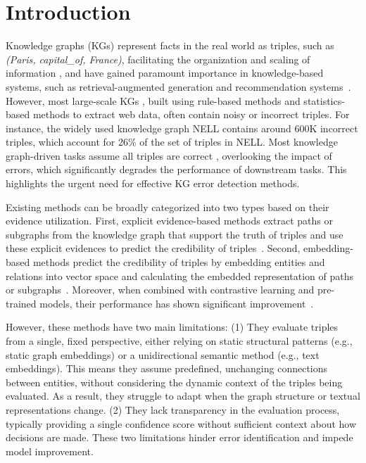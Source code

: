 \section{Introduction}

Knowledge graphs (KGs) \cite{kg} represent facts in the real world as triples, such as \textit{(Paris, capital\_of, France)}, facilitating the organization and scaling of information \cite{kg-info}, and have gained paramount importance in knowledge-based systems, such as retrieval-augmented generation and recommendation systems~\cite{recommend}.
% 
However, most large-scale KGs \cite{kg}, built using rule-based methods and statistics-based methods to extract web data, often contain noisy or incorrect triples. For instance, the widely used knowledge graph NELL \cite{survey} contains around 600K incorrect triples, which account for 26\% of the set of triples in NELL. Most knowledge graph-driven tasks assume all triples are correct \cite{survey}, overlooking the impact of errors, which significantly degrades the performance of downstream tasks. This highlights the urgent need for effective KG error detection methods.

Existing methods can be broadly categorized into two types based on their evidence utilization. First, explicit evidence-based methods extract paths or subgraphs from the knowledge graph that support the truth of triples and use these explicit evidences to predict the credibility of triples~\cite{shi}. Second, embedding-based methods predict the credibility of triples by embedding entities and relations into vector space and calculating the embedded representation of paths or subgraphs~\cite{kgttm,embedding2}. Moreover, when combined with contrastive learning and pre-trained models, their performance has shown significant improvement~\cite{kg-bert,cca,sesicl}.

However, these methods have two main limitations: (1) They evaluate triples from a single, fixed perspective, either relying on static structural patterns (e.g., static graph embeddings) or a unidirectional semantic method (e.g., text embeddings). This means they assume predefined, unchanging connections between entities, without considering the dynamic context of the triples being evaluated. As a result, they struggle to adapt when the graph structure or textual representations change.
%
(2) They lack transparency in the evaluation process, typically providing a single confidence score without sufficient context about how decisions are made. These two limitations hinder error identification and impede model improvement. 


